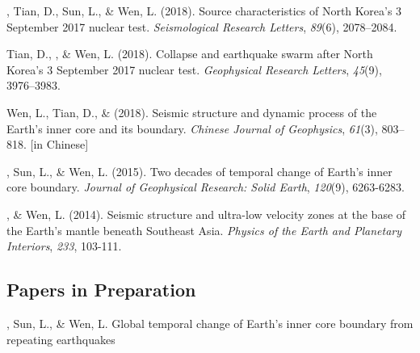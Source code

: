 \begin{etaremune}
    \Yao, Tian, D., Sun, L., \& Wen, L. (2018).
	Source characteristics of North Korea's 3 September 2017 nuclear test.
    \textit{Seismological Research Letters}, \textit{89}(6), 2078--2084.
\item
    Tian, D., \Yao\CF, \& Wen, L. (2018).
    Collapse and earthquake swarm after North Korea's 3 September 2017 nuclear test.
    \textit{Geophysical Research Letters}, \textit{45}(9), 3976--3983.
\item
    Wen, L., Tian, D., \& \Yao (2018).
    Seismic structure and dynamic process of the Earth's inner core and its boundary.
    \textit{Chinese Journal of Geophysics}, \textit{61}(3), 803--818.
     [in Chinese]
\item
    \Yao, Sun, L., \& Wen, L. (2015).
    Two decades of temporal change of Earth's inner core boundary.
    \textit{Journal of Geophysical Research: Solid Earth}, \textit{120}(9), 6263-6283.
\item
    \Yao, \& Wen, L. (2014).
    Seismic structure and ultra-low velocity zones at the base of the Earth's mantle beneath Southeast Asia.
    \textit{Physics of the Earth and Planetary Interiors}, \textit{233}, 103-111.
\end{etaremune}


\subsection*{Papers in Preparation}
\begin{etaremune}
\item
    \Yao, Sun, L., \& Wen, L.
    Global temporal change of Earth’s inner core boundary from repeating earthquakes
\end{etaremune}
